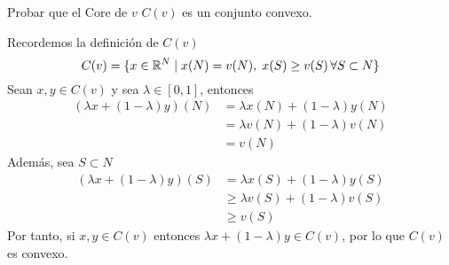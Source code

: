 \documentclass[twoside]{article}
\begin{document}
\begin{ejercicio}{3}
Probar que el Core de $v$ $C(v)$ es un conjunto convexo.
\end{ejercicio}
\begin{solucion}
Recordemos la definición de $C(v)$
$$
C(v)=\{x\in \mathbb{R}^N\mid x(N)=v(N),\; x(S)\geq v(S) \,\forall S\subset N\}
$$
Sean $x,y \in C(v)$ y sea $\lambda \in [0,1]$, entonces
\begin{align*}
(\lambda x + (1-\lambda)y)(N) &= \lambda x (N) + (1-\lambda)y(N)\\
&= \lambda v(N) + (1-\lambda) v(N) \\
&= v(N)
\end{align*}
Además, sea $S\subset N$
\begin{align*}
(\lambda x + (1-\lambda)y)(S) & = \lambda x (S) + (1-\lambda)y(S)\\
&\geq  \lambda v(S) + (1-\lambda) v(S) \\
&\geq v(S)
\end{align*}
Por tanto, si $x,y\in C(v)$ entonces $\lambda x + (1-\lambda) y \in C(v)$, por lo que $C(v)$ es convexo.
\end{solucion}
\end{document}
